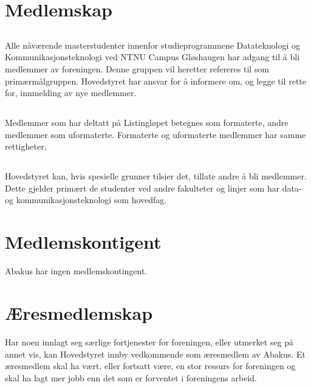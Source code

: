 \section{Medlemskap}

\subsection{}
Alle nåværende masterstudenter innenfor studieprogrammene Datateknologi og Kommunikasjonsteknologi
ved NTNU Campus Gløshaugen har adgang til å bli medlemmer av foreningen. Denne gruppen vil heretter refereres til som primærmålgruppen. Hovedstyret har ansvar
for å informere om, og legge til rette for, innmelding av nye medlemmer.

\subsection{}
Medlemmer som har deltatt på Listingløpet betegnes som formaterte, andre
medlemmer som uformaterte. Formaterte og uformaterte medlemmer har samme
rettigheter.

\subsection{}
Hovedstyret kan, hvis spesielle grunner tilsier det, tillate andre å bli
medlemmer. Dette gjelder primært de studenter ved andre fakulteter og linjer
som har data- og kommunikasjonsteknologi som hovedfag.

\section{Medlemskontigent}
Abakus har ingen medlemskontingent.

\section{Æresmedlemskap}
Har noen innlagt seg særlige fortjenester for foreningen, eller utmerket seg
på annet vis, kan Hovedstyret innby vedkommende som æresmedlem av Abakus. Et
æresmedlem skal ha vært, eller fortsatt være, en stor ressurs for foreningen og
skal ha lagt mer jobb enn det som er forventet i foreningens arbeid.
